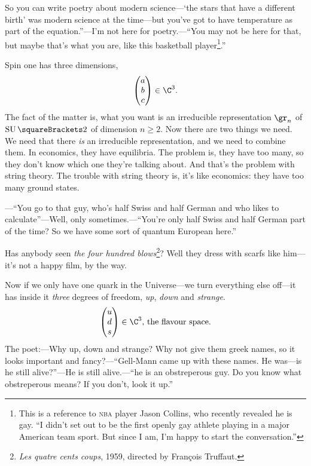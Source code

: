 \documentclass[10pt, a4paper, twoside]{lecturenotes}
\begin{document}
So you can write poetry about modern science---`the stars that have a different birth' was modern science at the time---but you've got to have temperature as part of the equation.''---I'm not here for poetry.---``You may not be here for that, but maybe that's what you are, like this basketball player\footnote{This is a reference to \textsc{nba} player Jason Collins, who recently revealed he is gay. ``I didn't set out to be the first openly gay athlete playing in a major American team sport. But since I am, I'm happy to start the conversation.''}.''

Spin one has three dimensions,\[
\begin{pmatrix}
a\\ b\\ c
\end{pmatrix}\in\C^3\text.
\] The fact of the matter is, what you want is an irreducible representation $\gr_n$ of $\SpecialUnitaryGroup\of 2$ of dimension $n\geq 2$. Now there are two things we need. We need that there \emph{is} an irreducible representation, and we need to combine them. In economics, they have equilibria. The problem is, they have too many, so they don't know which one they're talking about. And that's the problem with string theory. The trouble with string theory is, it's like economics: they have too many ground states.

---``You go to that guy, who's half Swiss and half German and who likes to calculate''---Well, only sometimes.---``You're only half Swiss and half German part of the time? So we have some sort of quantum European here.'' 

Has anybody seen \emph{the four hundred blows}\footnote{\emph{Les quatre cents coups}, 1959, directed by François Truffaut.}? Well they dress with scarfs like him---it's not a happy film, by the way.

Now if we only have one quark in the Universe---we turn everything else off---it has inside it \emph{three} degrees of freedom, \emph{up}, \emph{down} and \emph{strange}.
\[
\begin{pmatrix}
u\\ d\\ s
\end{pmatrix}\in \C^3 \text{, the flavour space.}
\]
The poet:---Why up, down and strange? Why not give them greek names, so it looks important and fancy?---``Gell-Mann came up with these names. He was---is he still alive?''---He is still alive.---``he is an obstreperous guy. Do you know what obstreperous means? If you don't, look it up.'' 
\end{document}
